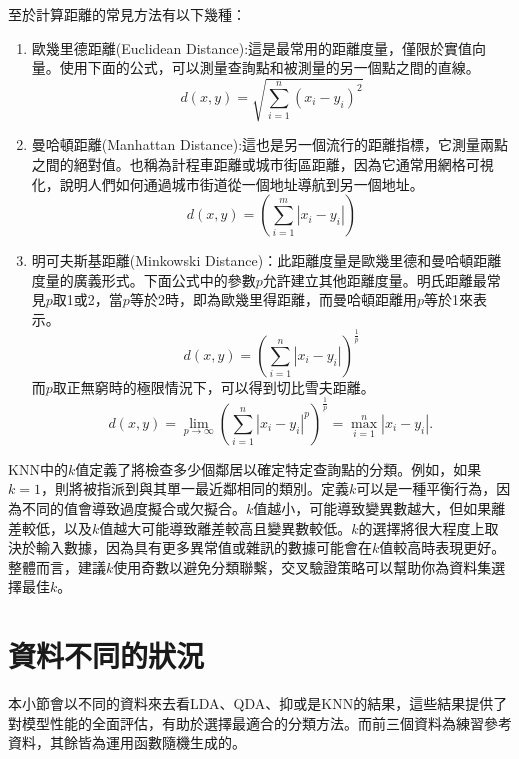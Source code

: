 \documentclass[12pt, a4paper]{article}
\begin{document}
至於計算距離的常見方法有以下幾種：
\begin{enumerate}
\item 歐幾里德距離(Euclidean Distance):這是最常用的距離度量，僅限於實值向量。使用下面的公式，可以測量查詢點和被測量的另一個點之間的直線。
$$d(x,y)=\sqrt{\sum_{i=1}^n(x_i-y_i)^2}$$
\item 曼哈頓距離(Manhattan Distance):這也是另一個流行的距離指標，它測量兩點之間的絕對值。也稱為計程車距離或城市街區距離，因為它通常用網格可視化，說明人們如何通過城市街道從一個地址導航到另一個地址。
$$d(x,y)=(\sum_{i=1}^m\left|x_i-y_i\right|)$$
\item 明可夫斯基距離(Minkowski Distance)：此距離度量是歐幾里德和曼哈頓距離度量的廣義形式。下面公式中的參數$p$允許建立其他距離度量。明氏距離最常見$p$取1或2，當$p$等於2時，即為歐幾里得距離，而曼哈頓距離用$p$等於1來表示。
$$d(x,y)=(\sum_{i=1}^n\left|x_i-y_i\right|)^{\frac{1}{p}}$$
而$p$取正無窮時的極限情況下，可以得到切比雪夫距離。
$$d(x,y)={\displaystyle \lim _{p\to \infty }{\left(\sum _{i=1}^{n}|x_{i}-y_{i}|^{p}\right)^{\frac {1}{p}}}=\max _{i=1}^{n}|x_{i}-y_{i}|.\,}$$
\end{enumerate}
KNN中的$k$值定義了將檢查多少個鄰居以確定特定查詢點的分類。例如，如果$k=1$，則將被指派到與其單一最近鄰相同的類別。定義$k$可以是一種平衡行為，因為不同的值會導致過度擬合或欠擬合。$k$值越小，可能導致變異數越大，但如果離差較低，以及$k$值越大可能導致離差較高且變異數較低。$k$的選擇將很大程度上取決於輸入數據，因為具有更多異常值或雜訊的數據可能會在$k$值較高時表現更好。整體而言，建議$k$使用奇數以避免分類聯繫，交叉驗證策略可以幫助你為資料集選擇最佳$k$。
\section{資料不同的狀況}
本小節會以不同的資料來去看LDA、QDA、抑或是KNN的結果，這些結果提供了對模型性能的全面評估，有助於選擇最適合的分類方法。而前三個資料為練習參考資料，其餘皆為運用函數隨機生成的。
\end{document}
